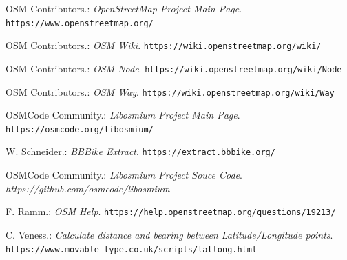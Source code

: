 \documentclass[11pt]{article}
\begin{document}
	\begin{thebibliography}{9}
		OSM Contributors.:
		\textit{OpenStreetMap Project Main Page}.
		\texttt{https://www.openstreetmap.org/}		
		
		OSM Contributors.:
		\textit{OSM Wiki}.
		\texttt{https://wiki.openstreetmap.org/wiki/}	
		
		OSM Contributors.:
		\textit{OSM Node}.
		\texttt{https://wiki.openstreetmap.org/wiki/Node}
	
		OSM Contributors.:
		\textit{OSM Way}.
		\texttt{https://wiki.openstreetmap.org/wiki/Way}
		
		OSMCode Community.:
		\textit{Libosmium Project Main Page}.
		\texttt{https://osmcode.org/libosmium/}
		
		W. Schneider.:
		\textit{BBBike Extract}.
		\texttt{https://extract.bbbike.org/}		
		
		OSMCode Community.:
		\textit{Libosmium Project Souce Code}.
		\textit{https://github.com/osmcode/libosmium}
		
		F. Ramm.:
		\textit{OSM Help}.
		\texttt{https://help.openstreetmap.org/questions/19213/}
		
		C. Veness.:
		\textit{Calculate distance and bearing between Latitude/Longitude points}.
		\texttt{https://www.movable-type.co.uk/scripts/latlong.html}
	\end{thebibliography}
	
\end{document}
